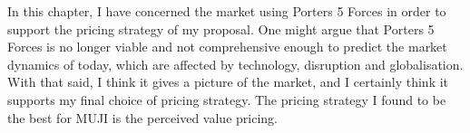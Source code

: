 In this chapter, I have concerned the market using Porters 5 Forces in order to support the pricing strategy of my proposal. One might argue that Porters 5 Forces is no longer viable and not comprehensive enough to predict the market dynamics of today, which are affected by technology, disruption and globalisation. With that said, I think it gives a picture of the market, and I certainly think it supports my final choice of pricing strategy. The pricing strategy I found to be the best for MUJI is the perceived value pricing.  